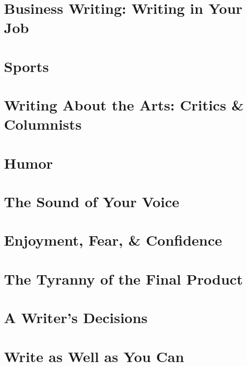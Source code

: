 \documentclass{article}
\begin{document}
\section{Business Writing: Writing in Your Job}


\section{Sports}


\section{Writing About the Arts: Critics \& Columnists}


\section{Humor}


\section{The Sound of Your Voice}


\section{Enjoyment, Fear, \& Confidence}


\section{The Tyranny of the Final Product}


\section{A Writer's Decisions}


\section{Write as Well as You Can}


\printbibliography[heading=bibintoc]
\end{document}
